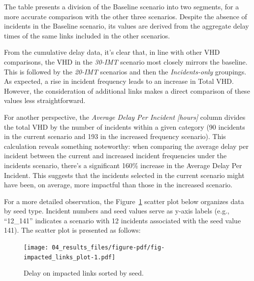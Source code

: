 \documentclass[fancy, oneside, mastersfancy, ms]{byuthesis}
\begin{document}
The table presents a division of the Baseline scenario into two
segments, for a more accurate comparison with the other three scenarios.
Despite the absence of incidents in the Baseline scenario, its values
are derived from the aggregate delay times of the same links included in
the other scenarios.

From the cumulative delay data, it's clear that, in line with other VHD
comparisons, the VHD in the \emph{30-IMT} scenario most closely mirrors
the baseline. This is followed by the \emph{20-IMT} scenarios and then
the \emph{Incidents-only} groupings. As expected, a rise in incident
frequency leads to an increase in Total VHD. However, the consideration
of additional links makes a direct comparison of these values less
straightforward.

For another perspective, the \emph{Average Delay Per Incident
{[}hours{]}} column divides the total VHD by the number of incidents
within a given category (90 incidents in the current scenario and 193 in
the increased frequency scenario). This calculation reveals something
noteworthy: when comparing the average delay per incident between the
current and increased incident frequencies under the incidents scenario,
there's a significant 160\% increase in the Average Delay Per Incident.
This suggests that the incidents selected in the current scenario might
have been, on average, more impactful than those in the increased
scenario.

For a more detailed observation, the
Figure~\ref{fig-impacted_links_plot} scatter plot below organizes data
by seed type. Incident numbers and seed values serve as y-axis labels
(e.g., ``12\_141'' indicates a scenario with 12 incidents associated
with the seed value 141). The scatter plot is presented as follows:

\begin{figure}

{\centering \texttt{[image: 04\_results\_files/figure-pdf/fig-impacted\_links\_plot-1.pdf]}

}

\caption{\label{fig-impacted_links_plot}Delay on impacted links sorted
by seed.}

\end{figure}
\end{document}
